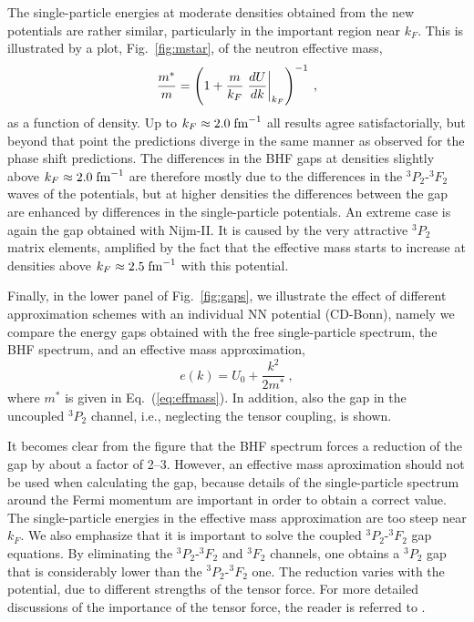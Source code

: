 \documentclass[preprint,rmp,aps,floatfix]{revtex4}
\begin{document}
The single-particle energies at moderate densities obtained from the 
new potentials are rather similar, particularly in the 
important region near $k_F$.  
This is illustrated by a plot, Fig.~\ref{fig:mstar},
of the neutron effective mass,
\begin{equation}
 {m^*\over m} = \left( 1 + {m\over k_F} 
 \left.{dU\over dk}\right|_{k_F} \right)^{-1} \:,
\label{eq:effmass}
\end{equation}
as a function of density.
Up to $k_F \approx 2.0\;{\rm fm}^{-1}$ all results agree satisfactorially,
but beyond that point the predictions diverge in the same manner as observed
for the phase shift predictions.
The differences in the BHF gaps at densities slightly above  
$k_F\approx 2.0\;{\rm fm}^{-1}$ are therefore mostly 
due to the differences in the $^3P_2$-$^3F_2$ waves of the potentials,
but at higher densities the differences between the gap are enhanced 
by differences in the single-particle potentials.
An extreme case is again the gap obtained with Nijm-II.  
It is caused by the very attractive $^3P_2$ matrix elements, 
amplified by the fact that the effective mass 
starts to increase at densities above $k_F\approx 2.5\;{\rm fm}^{-1}$ 
with this potential.  



Finally, in the lower panel of Fig.~\ref{fig:gaps}, we illustrate the
effect of different approximation schemes with an individual NN potential
(CD-Bonn), namely we compare the energy gaps obtained 
with the free single-particle spectrum, the BHF spectrum,
and an effective mass approximation,
\begin{equation}
  e(k) = U_0 + \frac{k^2}{2m^*} \:,
\label{eq:mstarapp}
\end{equation}
where $m^*$ is given in Eq.~(\ref{eq:effmass}).
In addition, also the gap in the uncoupled $^3P_2$ channel, 
i.e., neglecting the tensor coupling, is shown.

It becomes clear from the figure that the BHF spectrum forces a 
reduction of the gap by about a factor of 2--3.
However, an effective mass aproximation should not be used when 
calculating the gap,  
because details of the single-particle spectrum around the Fermi 
momentum are important in order to obtain a correct value.   
The single-particle energies in the effective mass 
approximation are too steep near $k_F$.
We also emphasize that it is important to solve the coupled 
$^3P_2$-$^3F_2$ gap equations.  
By eliminating the $^3P_2$-$^3F_2$ and $^3F_2$ channels, 
one obtains a $^3P_2$ gap that is considerably lower than the 
$^3P_2$-$^3F_2$ one.  
The reduction varies with the potential,
due to different strengths of the tensor force.
For more detailed discussions of the importance of the tensor force, 
the reader is referred to \cite{amu85,taka93,elga96,kkc2001,kkc1998}.
\end{document}
